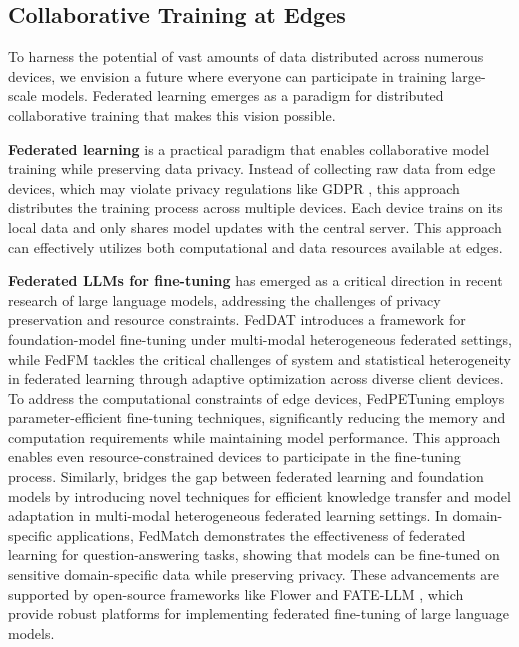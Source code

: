 \subsection{Collaborative Training at Edges}\label{subsec:collaborative_training}

To harness the potential of vast amounts of data distributed across numerous devices, we envision a future where everyone can participate in training large-scale models. Federated learning emerges as a paradigm for distributed collaborative training that makes this vision possible.


\textbf{Federated learning} \cite{mcmahan2017communication} is a practical paradigm that enables collaborative model training while preserving data privacy. Instead of collecting raw data from edge devices, which may violate privacy regulations like GDPR \cite{regulation2018general}, this approach distributes the training process across multiple devices. Each device trains on its local data and only shares model updates with the central server. This approach can effectively utilizes both computational and data resources available at edges.


\textbf{Federated LLMs for fine-tuning}
has emerged as a critical direction in recent research of large language models, addressing the challenges of privacy preservation and resource constraints. FedDAT \cite{chen2024feddat} introduces a framework for foundation-model fine-tuning under multi-modal heterogeneous federated settings, while FedFM \cite{yang2025federated} tackles the critical challenges of system and statistical heterogeneity in federated learning through adaptive optimization across diverse client devices.
To address the computational constraints of edge devices, FedPETuning \cite{zhang2023fedpetuning} employs parameter-efficient fine-tuning techniques, significantly reducing the memory and computation requirements while maintaining model performance. This approach enables even resource-constrained devices to participate in the fine-tuning process. Similarly, \cite{chen2024feddat} bridges the gap between federated learning and foundation models by introducing novel techniques for efficient knowledge transfer and model adaptation in multi-modal heterogeneous federated learning settings.
In domain-specific applications, FedMatch \cite{chen2021fedmatch} demonstrates the effectiveness of federated learning for question-answering tasks, showing that models can be fine-tuned on sensitive domain-specific data while preserving privacy. These advancements are supported by open-source frameworks like Flower \cite{Flower} and FATE-LLM \cite{fan2023fate}, which provide robust platforms for implementing federated fine-tuning of large language models. 



